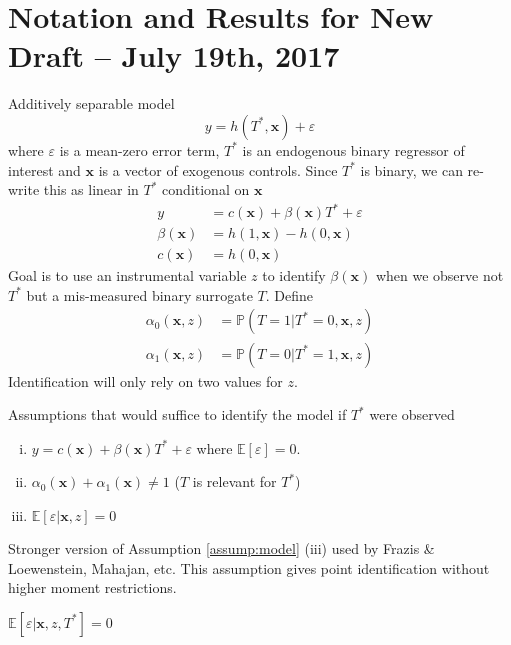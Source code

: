 \documentclass[12pt]{article}
\begin{document}

\section{Notation and Results for New Draft -- July 19th, 2017}


Additively separable model
\[
  y = h(T^*,\mathbf{x})+\varepsilon
\]
where $\varepsilon$ is a mean-zero error term, $T^*$ is an endogenous binary regressor of interest and $\mathbf{x}$ is a vector of exogenous controls.
Since $T^*$ is binary, we can re-write this as linear in $T^*$ conditional on $\mathbf{x}$
\begin{align*}
  y &= c(\mathbf{x}) + \beta(\mathbf{x}) T^* + \varepsilon\\
  \beta(\mathbf{x}) &= h(1,\mathbf{x}) - h(0,\mathbf{x})\\
  c(\mathbf{x}) &= h(0,\mathbf{x})
\end{align*}
Goal is to use an instrumental variable $z$ to identify $\beta(\mathbf{x})$ when we observe not $T^*$ but a mis-measured binary surrogate $T$. 
Define
\begin{align*}
  \alpha_0(\mathbf{x},z) &= \mathbb{P}\left(T=1|T^*=0,\mathbf{x},z  \right)\\
  \alpha_1(\mathbf{x},z) &= \mathbb{P}\left(T=0|T^*=1,\mathbf{x},z  \right)
\end{align*}
Identification will only rely on two values for $z$.

\noindent Assumptions that would suffice to identify the model if $T^*$ were observed
\begin{assump} \mbox{}
  \label{assump:model}
  \begin{enumerate}[(i)] 
    \item $y = c(\mathbf{x}) + \beta(\mathbf{x})T^* + \varepsilon$ where $\mathbb{E}[\varepsilon]=0$.
    \item $\alpha_0(\mathbf{x}) + \alpha_1(\mathbf{x}) \neq 1$ ($T$ is relevant for $T^*$)
    \item $\mathbb{E}[\varepsilon|\mathbf{x},z] = 0$
  \end{enumerate}
\end{assump}

\noindent Stronger version of Assumption \ref{assump:model} (iii) used by Frazis \& Loewenstein, Mahajan, etc.
This assumption gives point identification without higher moment restrictions.
\begin{assump} \mbox{}
  \label{assump:jointExog}
    $\mathbb{E}[\varepsilon|\mathbf{x},z, T^*] = 0$
\end{assump}
\end{document}

